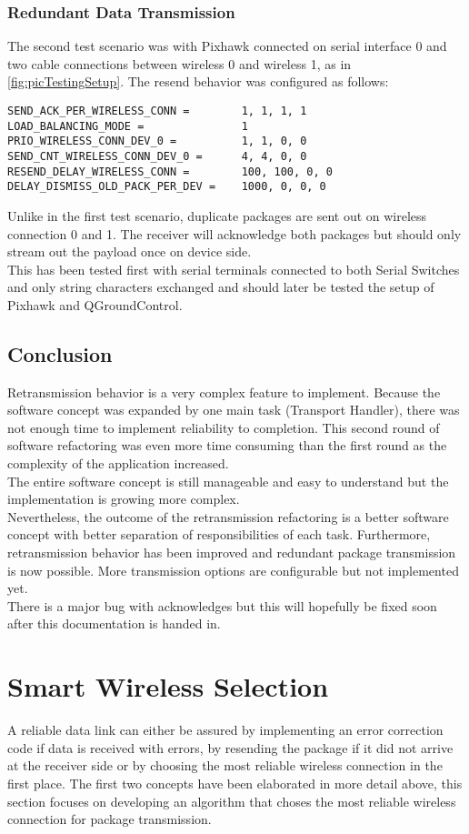 \subsubsection{Redundant Data Transmission}
The second test scenario was with Pixhawk connected on serial interface 0 and two cable connections between wireless 0 and wireless 1, as in \autoref{fig:picTestingSetup}. The resend behavior was configured as follows:
\begin{lstlisting}
SEND_ACK_PER_WIRELESS_CONN =		1, 1, 1, 1
LOAD_BALANCING_MODE =				1
PRIO_WIRELESS_CONN_DEV_0 =			1, 1, 0, 0
SEND_CNT_WIRELESS_CONN_DEV_0 =		4, 4, 0, 0
RESEND_DELAY_WIRELESS_CONN =		100, 100, 0, 0
DELAY_DISMISS_OLD_PACK_PER_DEV =	1000, 0, 0, 0
\end{lstlisting}
Unlike in the first test scenario, duplicate packages are sent out on wireless connection 0 and 1. The receiver will acknowledge both packages but should only stream out the payload once on device side.\\
This has been tested first with serial terminals connected to both Serial Switches and only string characters exchanged and should later be tested the setup of Pixhawk and QGroundControl.
%
\subsection{Conclusion}
Retransmission behavior is a very complex feature to implement. Because the software concept was expanded by one main task (Transport Handler), there was not enough time to implement reliability to completion. This second round of software refactoring was even more time consuming than the first round as the complexity of the application increased.\\
The entire software concept is still manageable and easy to understand but the implementation is growing more complex.\\
Nevertheless, the outcome of the retransmission refactoring is a better software concept with better separation of responsibilities of each task. Furthermore, retransmission behavior has been improved and redundant package transmission is now possible. More transmission options are configurable but not implemented yet.\\
There is a major bug with acknowledges but this will hopefully be fixed soon after this documentation is handed in.
%
%
%
%
%
\section{Smart Wireless Selection} \label{sec:txtSmartWirelessSelection}
A reliable data link can either be assured by implementing an error correction code if data is received with errors, by resending the package if it did not arrive at the receiver side or by choosing the most reliable wireless connection in the first place. The first two concepts have been elaborated in more detail above, this section focuses on developing an algorithm that choses the most reliable wireless connection for package transmission.
%
%
